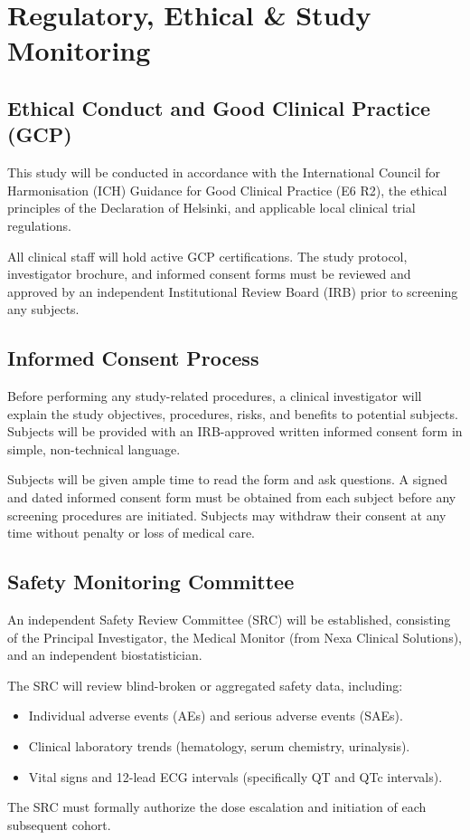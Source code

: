 \section{Regulatory, Ethical \& Study Monitoring}
\label{sec:regulatory}

\subsection{Ethical Conduct and Good Clinical Practice (GCP)}

This study will be conducted in accordance with the International Council for Harmonisation (ICH) Guidance for Good Clinical Practice (E6 R2), the ethical principles of the Declaration of Helsinki, and applicable local clinical trial regulations. 

All clinical staff will hold active GCP certifications. The study protocol, investigator brochure, and informed consent forms must be reviewed and approved by an independent Institutional Review Board (IRB) prior to screening any subjects.

\subsection{Informed Consent Process}

Before performing any study-related procedures, a clinical investigator will explain the study objectives, procedures, risks, and benefits to potential subjects. Subjects will be provided with an IRB-approved written informed consent form in simple, non-technical language. 

Subjects will be given ample time to read the form and ask questions. A signed and dated informed consent form must be obtained from each subject before any screening procedures are initiated. Subjects may withdraw their consent at any time without penalty or loss of medical care.

\subsection{Safety Monitoring Committee}

An independent Safety Review Committee (SRC) will be established, consisting of the Principal Investigator, the Medical Monitor (from Nexa Clinical Solutions), and an independent biostatistician. 

The SRC will review blind-broken or aggregated safety data, including:
\begin{itemize}
  \item Individual adverse events (AEs) and serious adverse events (SAEs).
  \item Clinical laboratory trends (hematology, serum chemistry, urinalysis).
  \item Vital signs and 12-lead ECG intervals (specifically QT and QTc intervals).
\end{itemize}
The SRC must formally authorize the dose escalation and initiation of each subsequent cohort.

